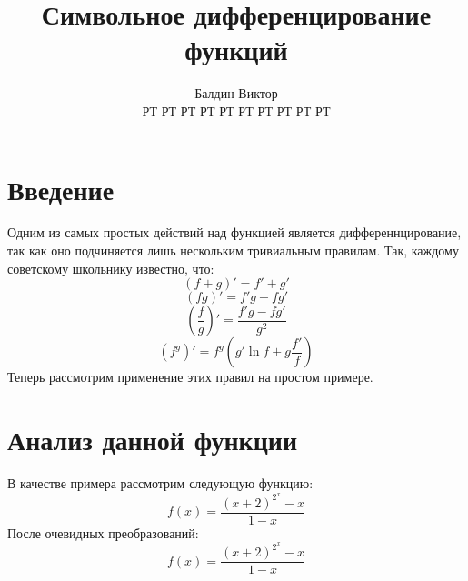 \documentclass{article}
\title{Символьное дифференцирование функций}
\author{Балдин Виктор\\РТ РТ РТ РТ РТ РТ РТ РТ РТ РТ}
\begin{document}
\maketitle
\section{Введение}
Одним из самых простых действий над функцией является дифференнцирование, так как оно подчиняется лишь нескольким тривиальным правилам. Так, каждому советскому школьнику известно, что:
$$(f+g)'=f'+g'$$
$$(fg)' =f'g+fg'$$
$$\left(\frac{f}{g}\right)'=\frac{f'g-fg'}{g^2}$$
$$(f^g)'=f^g\left(g'\ln f+g\frac{f'}{f}\right)$$Теперь рассмотрим применение этих правил на простом примере.\section{Анализ данной функции}
В качестве примера рассмотрим следующую функцию:
$$f(x)=\frac{\left(x+2\right)^{2^{x}}-x}{1-x}$$
После очевидных преобразований:$$f(x)=\frac{\left(x+2\right)^{2^{x}}-x}{1-x}$$
\end{document}
